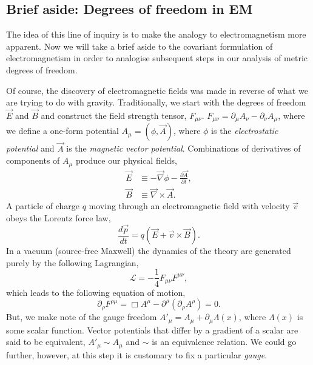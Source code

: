 \subsection{Brief aside: Degrees of freedom in EM}
The idea of this line of inquiry is to make the analogy to electromagnetism more apparent. Now we will take a brief aside to the covariant formulation of electromagnetism in order to analogise subsequent steps in our analysis of metric degrees of freedom. 

Of course, the discovery of electromagnetic fields was made in reverse of what we are trying to do with gravity. Traditionally, we start with the degrees of freedom $\vec{E}$ and $\vec{B}$ and construct the field strength tensor, $F_{\mu\nu}$. $F_{\mu\nu} =\partial_{\mu}A_{\nu} - \partial_{\nu}A_{\mu}$, where we define a one-form potential $A_{\mu} = \left(\phi, \vec{A}\right)$, where $\phi$ is the \textit{electrostatic potential} and $\vec{A}$ is the \textit{magnetic vector potential}. Combinations of derivatives of components of $A_{\mu}$ produce our physical fields, 
\begin{equation}
    \begin{split}
    \vec{E} &\equiv -\vec{\nabla}\phi - \frac{\partial \vec{A}}{\partial t}, \\
    \vec{B} &\equiv \vec{\nabla}\times\vec{A}.
    \end{split}
    \label{EandMFields}
\end{equation}
A particle of charge $q$ moving through an electromagnetic field with velocity $\vec{v}$ obeys the Lorentz force law,
\begin{equation}\label{lorentz-force-law}
    \frac{d\vec{p}}{d t} = q\left(\vec{E}+ \vec{v}\times\vec{B}\right).
\end{equation}
In a vacuum (source-free Maxwell) the dynamics of the theory are generated purely by the following Lagrangian, 
\begin{equation}\nonumber
    \mathcal{L} = -\frac{1}{4} F_{\mu\nu}F^{\mu\nu},
\end{equation}
which leads to the following equation of motion,
\begin{equation}\label{em-eom}
\partial_{\rho}F^{\rho\mu} = \Box A^{\mu} - \partial^{\mu}(\partial_{\rho}A^{\rho}) = 0.
\end{equation}
But, we make note of the gauge freedom $A'_{\mu} = A_{\mu} + \partial_{\mu}\Lambda(x)$, where $\Lambda(x)$ is some scalar function. Vector potentials that differ by a gradient of a scalar are said to be equivalent, $A'_{\mu}\sim{A_{\mu}}$ and $\sim{}$ is an equivalence relation. We could go further, however, at this step it is customary to fix a particular \textit{gauge}. 
